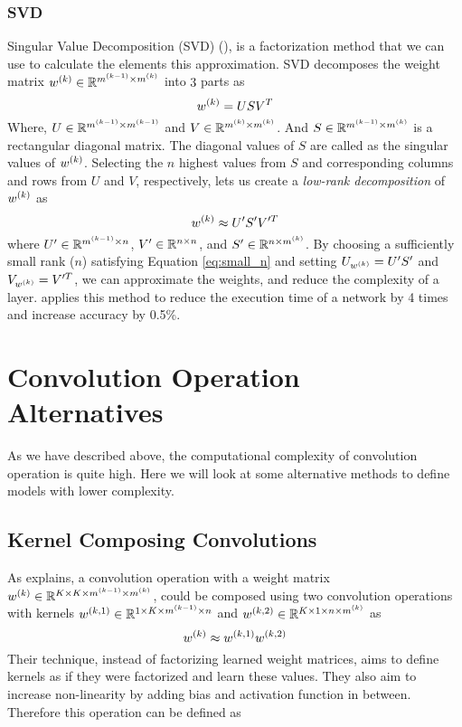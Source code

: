 \subsubsection{SVD}
Singular Value Decomposition (SVD) (\cite{golub1970singular}), is a factorization method that we can use to calculate the elements this approximation. SVD decomposes the weight matrix $w^{(k)} \in \mathbb{R}^{m^{(k-1)} \times m^{(k)}}$ into $3$ parts as
$$ w^{(k)} = USV^T $$
Where, $U \in \mathbb{R}^{m^{(k-1)} \times m^{(k-1)}}$ and $V \in \mathbb{R}^{m^{(k)} \times m^{(k)}}$. And $S \in \mathbb{R}^{m^{(k-1)} \times m^{(k)}}$ is a rectangular diagonal matrix. The diagonal values of $S$ are called as the singular values of $w^{(k)}$. Selecting the $n$ highest values from $S$ and corresponding columns and rows from $U$ and $V$, respectively, lets us create a \textit{low-rank decomposition} of $w^{(k)}$ as
$$ w^{(k)} \approx U'S'V'^T $$
where $U' \in \mathbb{R}^{m^{(k-1)} \times n}$, $V' \in \mathbb{R}^{n \times n}$, and $S' \in \mathbb{R}^{n \times m^{(k)}}$. By choosing a sufficiently small rank ($n$) satisfying Equation \ref{eq:small_n} and setting $U_{w^{(k)}}=U'S'$ and $V_{w^{(k)}} = V'^T$, we can approximate the weights, and reduce the complexity of a layer. \cite{zhang2016accelerating} applies this method to reduce the execution time of a network by 4 times and increase accuracy by 0.5\%.


\section{Convolution Operation Alternatives}
As we have described above, the computational complexity of convolution operation is quite high. Here we will look at some alternative methods to define models with lower complexity.
\subsection{Kernel Composing Convolutions}
As  \cite{alvarez2016decomposeme} explains, a convolution operation with a weight matrix $w^{(k)} \in \mathbb{R}^{K \times K \times m^{(k-1)} \times m^{(k)}}$, could be composed using two convolution operations with kernels $w^{(k,1)} \in \mathbb{R}^{1 \times K \times m^{(k-1)} \times n}$ and $w^{(k,2)} \in \mathbb{R}^{K \times 1 \times n \times m^{(k)}}$ as
$$ w^{(k)} \approx w^{(k,1)} w^{(k,2)} $$
Their technique, instead of factorizing learned weight matrices, aims to define kernels as if they were factorized and learn these values. They also aim to increase non-linearity by adding bias and activation function in between. Therefore this operation can be defined as

